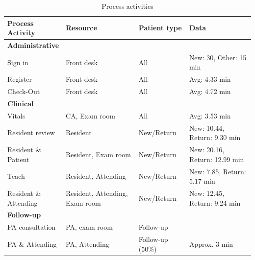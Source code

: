 \begin{table}[H]
\centering
\scriptsize
\setlength{\tabcolsep}{2.5pt}
\renewcommand{\arraystretch}{0.95}
\begin{tabularx}{\textwidth}{l l l X}
\toprule
\textbf{Process Activity} & \textbf{Resource} & \textbf{Patient type} & \textbf{Data} \\
\midrule

\multicolumn{4}{l}{\textbf{Administrative}} \\
Sign in & Front desk & All & New: 30, Other: 15 min \\
Register & Front desk & All & Avg: 4.33 min \\
Check-Out & Front desk & All & Avg: 4.72 min \\

\midrule
\multicolumn{4}{l}{\textbf{Clinical}} \\
Vitals & CA, Exam room & All & Avg: 3.53 min \\
Resident review & Resident & New/Return & New: 10.44, Return: 9.30 min \\
Resident \& Patient & Resident, Exam room & New/Return & New: 20.16, Return: 12.99 min \\
Teach & Resident, Attending & New/Return & New: 7.85, Return: 5.17 min \\
Resident \& Attending & Resident, Attending, Exam room & New/Return & New: 12.45, Return: 9.24 min \\

\midrule
\multicolumn{4}{l}{\textbf{Follow-up}} \\
PA consultation & PA, exam room & Follow-up & -- \\
PA \& Attending & PA, Attending & Follow-up (50\%) & Approx. 3 min \\

\bottomrule
\end{tabularx}
\caption{Process activities}
\label{tab:process}
\end{table}